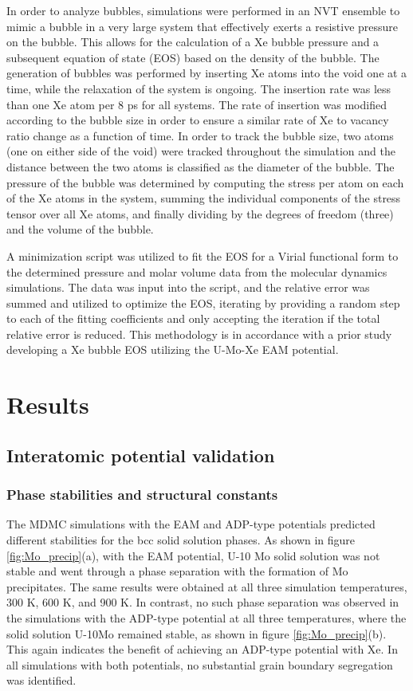 \documentclass[review]{elsarticle}
\begin{document}
In order to analyze bubbles, simulations were performed in an NVT ensemble to mimic a bubble in a very large system that effectively exerts a resistive pressure on the bubble. This allows for the calculation of a Xe bubble pressure and a subsequent equation of state (EOS) based on the density of the bubble. The generation of bubbles was performed by inserting Xe atoms into the void one at a time, while the relaxation of the system is ongoing. The insertion rate was less than one Xe atom per 8 ps for all systems. The rate of insertion was modified according to the bubble size in order to ensure a similar rate of Xe to vacancy ratio change as a function of time. In order to track the bubble size, two atoms (one on either side of the void) were tracked throughout the simulation and the distance between the two atoms is classified as the diameter of the bubble. The pressure of the bubble was determined by computing the stress per atom on each of the Xe atoms in the system, summing the individual components of the stress tensor over all Xe atoms, and finally dividing by the degrees of freedom (three) and the volume of the bubble. 

A minimization script was utilized to fit the EOS for a Virial functional form to the determined pressure and molar volume data from the molecular dynamics simulations. The data was input into the script, and the relative error was summed and utilized to optimize the EOS, iterating by providing a random step to each of the fitting coefficients and only accepting the iteration if the total relative error is reduced. This methodology is in accordance with a prior study \cite{Beeler2020} developing a Xe bubble EOS utilizing the U-Mo-Xe EAM potential.

\section{Results}
\subsection{Interatomic potential validation}

\subsubsection{Phase stabilities and structural constants}
The MDMC simulations with the EAM and ADP-type potentials predicted different stabilities for the bcc solid solution phases. As shown in figure \ref{fig:Mo_precip}(a), with the EAM potential, U-10 Mo solid solution was not stable and went through a phase separation with the formation of Mo precipitates. The same results were obtained at all three simulation temperatures, 300 K, 600 K, and 900 K. In contrast, no such phase separation was observed in the simulations with the ADP-type potential at all three temperatures, where the solid solution U-10Mo remained stable, as shown in figure \ref{fig:Mo_precip}(b). This again indicates the benefit of achieving an ADP-type potential with Xe. In all simulations with both potentials, no substantial grain boundary segregation was identified. 
\end{document}

